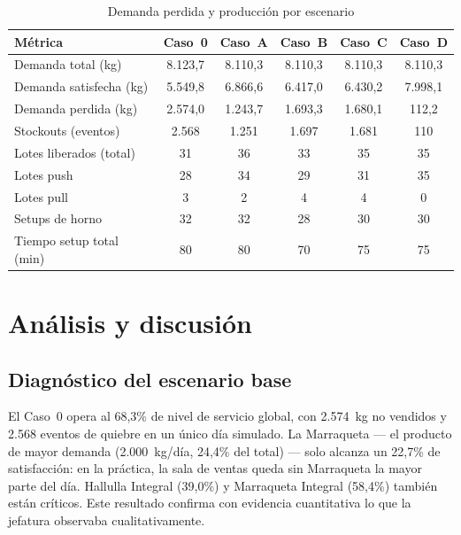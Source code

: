 \documentclass[12pt]{article}
\begin{document}
\begin{table}[H]
\centering
\caption{Demanda perdida y producción por escenario}
\label{tab:dem-perdida-acad}
\renewcommand{\arraystretch}{1.3}
\begin{tabularx}{\textwidth}{Xccccc}
\toprule
\rowcolor{tabhead}
\color{white}\textbf{Métrica} &
\color{white}\textbf{Caso~0} &
\color{white}\textbf{Caso~A} &
\color{white}\textbf{Caso~B} &
\color{white}\textbf{Caso~C} &
\color{white}\textbf{Caso~D} \\
\midrule
\rowcolor{tabrow} Demanda total (kg)         & 8.123,7 & 8.110,3 & 8.110,3 & 8.110,3 & 8.110,3 \\
Demanda satisfecha (kg)                      & 5.549,8 & 6.866,6 & 6.417,0 & 6.430,2 & 7.998,1 \\
\rowcolor{tabrow} Demanda perdida (kg)       & 2.574,0 & 1.243,7 & 1.693,3 & 1.680,1 & 112,2 \\
Stockouts (eventos)                          & 2.568 & 1.251 & 1.697 & 1.681 & 110 \\
\rowcolor{tabrow} Lotes liberados (total)    & 31 & 36 & 33 & 35 & 35 \\
Lotes push                                   & 28 & 34 & 29 & 31 & 35 \\
\rowcolor{tabrow} Lotes pull                 & 3 & 2 & 4 & 4 & 0 \\
Setups de horno                              & 32 & 32 & 28 & 30 & 30 \\
\rowcolor{tabrow} Tiempo setup total (min)   & 80 & 80 & 70 & 75 & 75 \\
\bottomrule
\end{tabularx}
\end{table}

\newpage
\section{Análisis y discusión}
\label{sec:analisis}

\subsection{Diagnóstico del escenario base}

El Caso~0 opera al 68,3\% de nivel de servicio global, con 2.574~kg no vendidos y 2.568 eventos de quiebre en un único día simulado. La Marraqueta --- el producto de mayor demanda (2.000~kg/día, 24,4\% del total) --- solo alcanza un 22,7\% de satisfacción: en la práctica, la sala de ventas queda sin Marraqueta la mayor parte del día. Hallulla Integral (39,0\%) y Marraqueta Integral (58,4\%) también están críticos. Este resultado confirma con evidencia cuantitativa lo que la jefatura observaba cualitativamente.
\end{document}
